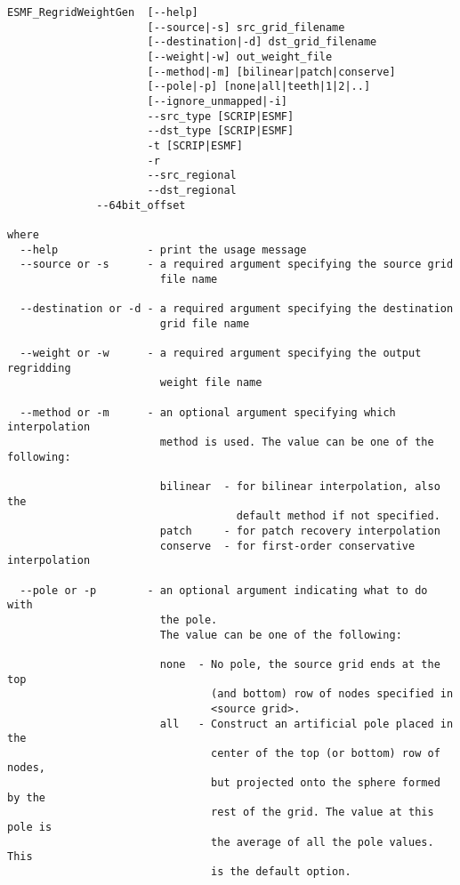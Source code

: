 \begin{verbatim}
ESMF_RegridWeightGen  [--help]
                      [--source|-s] src_grid_filename 
                      [--destination|-d] dst_grid_filename 
                      [--weight|-w] out_weight_file 
                      [--method|-m] [bilinear|patch|conserve] 
                      [--pole|-p] [none|all|teeth|1|2|..] 
                      [--ignore_unmapped|-i]
                      --src_type [SCRIP|ESMF] 
                      --dst_type [SCRIP|ESMF]
                      -t [SCRIP|ESMF]
                      -r
                      --src_regional
                      --dst_regional
		      --64bit_offset

where
  --help              - print the usage message 
  --source or -s      - a required argument specifying the source grid 
                        file name

  --destination or -d - a required argument specifying the destination 
                        grid file name

  --weight or -w      - a required argument specifying the output regridding 
                        weight file name

  --method or -m      - an optional argument specifying which interpolation 
                        method is used. The value can be one of the following:

                        bilinear  - for bilinear interpolation, also the 
                                    default method if not specified.
                        patch     - for patch recovery interpolation
                        conserve  - for first-order conservative interpolation

  --pole or -p        - an optional argument indicating what to do with 
                        the pole.  
                        The value can be one of the following:

                        none  - No pole, the source grid ends at the top 
                                (and bottom) row of nodes specified in 
                                <source grid>.
                        all   - Construct an artificial pole placed in the 
                                center of the top (or bottom) row of nodes, 
                                but projected onto the sphere formed by the 
                                rest of the grid. The value at this pole is 
                                the average of all the pole values. This
                                is the default option.


\end{verbatim}
